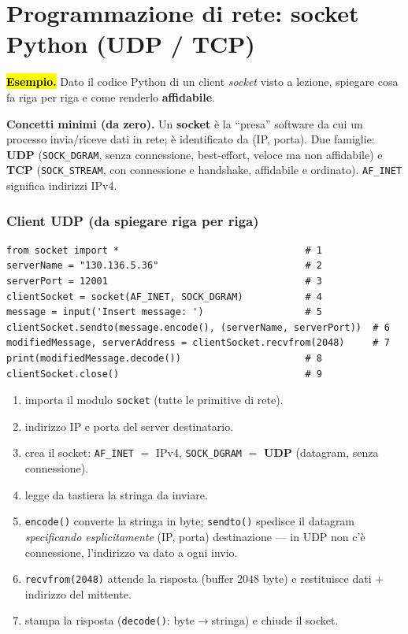 \documentclass[11pt,a4paper]{report}
\begin{document}
\section{Programmazione di rete: socket Python (UDP / TCP)}
\label{teoria:socket}
\hl{\textbf{Esempio.}} Dato il codice Python di un client
\emph{socket} visto a lezione, spiegare cosa fa riga per riga e come renderlo
\textbf{affidabile}.

\textbf{Concetti minimi (da zero).} Un \textbf{socket} è la ``presa'' software da
cui un processo invia/riceve dati in rete; è identificato da (IP, porta). Due
famiglie: \textbf{UDP} (\texttt{SOCK\_DGRAM}, senza connessione, best-effort,
veloce ma non affidabile) e \textbf{TCP} (\texttt{SOCK\_STREAM}, con connessione
e handshake, affidabile e ordinato). \texttt{AF\_INET} significa indirizzi IPv4.

\subsubsection*{Client UDP (da spiegare riga per riga)}
\begin{verbatim}
from socket import *                                 # 1
serverName = "130.136.5.36"                          # 2
serverPort = 12001                                   # 3
clientSocket = socket(AF_INET, SOCK_DGRAM)           # 4
message = input('Insert message: ')                  # 5
clientSocket.sendto(message.encode(), (serverName, serverPort))  # 6
modifiedMessage, serverAddress = clientSocket.recvfrom(2048)     # 7
print(modifiedMessage.decode())                      # 8
clientSocket.close()                                 # 9
\end{verbatim}
\begin{enumerate}[noitemsep]
\item importa il modulo \texttt{socket} (tutte le primitive di rete).
\item[2--3.] indirizzo IP e porta del server destinatario.
\item crea il socket: \texttt{AF\_INET} $=$ IPv4, \texttt{SOCK\_DGRAM} $=$
\textbf{UDP} (datagram, senza connessione).
\item legge da tastiera la stringa da inviare.
\item \texttt{encode()} converte la stringa in byte; \texttt{sendto()} spedisce
il datagram \emph{specificando esplicitamente} (IP, porta) destinazione --- in
UDP non c'è connessione, l'indirizzo va dato a ogni invio.
\item \texttt{recvfrom(2048)} attende la risposta (buffer $2048$ byte) e
restituisce dati $+$ indirizzo del mittente.
\item[8--9.] stampa la risposta (\texttt{decode()}: byte$\to$stringa) e chiude il socket.
\end{enumerate}
\end{document}
